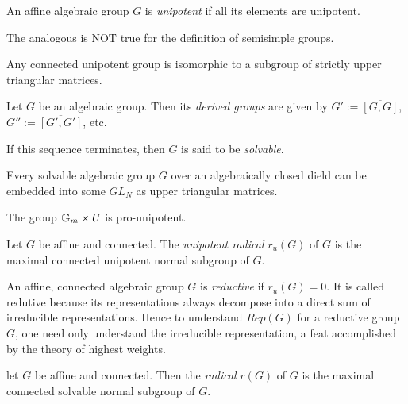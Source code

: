 \begin{defn}
An affine algebraic group $G$ is \emph{unipotent} if all its elements are unipotent.
\end{defn}

\begin{rem}[Warning!]
The analogous is NOT true for the definition of semisimple groups.
\end{rem}

\begin{prop}
Any connected unipotent group is isomorphic to a subgroup of strictly upper triangular matrices.
\end{prop}

\begin{defn}
Let $G$ be an algebraic group. Then its \emph{derived groups} are given by $G' := \overline{[G, G]}$, $G'' := \overline{[G', G']}$, etc.
\end{defn}
\begin{defn}
If this sequence terminates, then $G$ is said to be \emph{solvable}.
\end{defn}

\begin{thm}
Every solvable algebraic group $G$ over an algebraically closed dield can be embedded into some $GL_N$ as upper triangular matrices.
\end{thm}

\begin{exam}
The group $\mathbb{G}_m \ltimes U$ is pro-unipotent.
\end{exam}

\begin{defn}\label{def:uniradical}
Let $G$ be affine and connected. The \emph{unipotent radical} $r_u(G)$ of $G$ is the maximal connected unipotent normal subgroup of $G$.
\end{defn}

\begin{defn}
An affine, connected algebraic group $G$ is \emph{reductive} if $r_u(G) = 0$. It is called redutive because its representations always decompose into a direct sum of irreducible representations. Hence to understand $Rep(G)$ for a reductive group $G$, one need only understand the irreducible representation, a feat accomplished by the theory of highest weights.
\end{defn}

\begin{defn}[Radical]
let $G$ be affine and connected. Then the \emph{radical} $r(G)$ of $G$ is the maximal connected solvable normal subgroup of $G$.
\end{defn}

